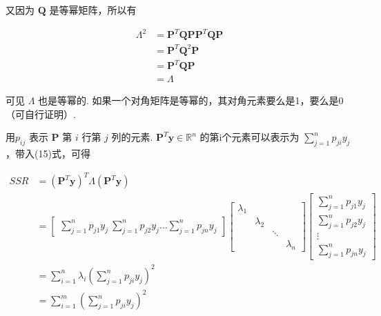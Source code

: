 \documentclass[UTF8]{ctexart}
\begin{document}
    又因为 $ \boldsymbol{Q} $ 是等幂矩阵，所以有
    
    \begin{equation}
    	\begin{aligned}
    	    \boldsymbol{\varLambda}^2 & = \boldsymbol{P}^T \boldsymbol{Q} \boldsymbol{P} \boldsymbol{P}^T \boldsymbol{Q} \boldsymbol{P} \\
    	    & = \boldsymbol{P}^T \boldsymbol{Q}^2 \boldsymbol{P} \\
    	    & = \boldsymbol{P}^T \boldsymbol{Q} \boldsymbol{P} \\
    	    & = \boldsymbol{\varLambda}
    	\end{aligned}
    \end{equation}

    可见 $ \boldsymbol{\varLambda} $ 也是等幂的. 如果一个对角矩阵是等幂的，其对角元素要么是1，要么是0（可自行证明）.
    
    用$ p_{ij} $ 表示 $ \boldsymbol{P} $ 第 $ i $ 行第 $ j $ 列的元素. $ \boldsymbol{P}^T \boldsymbol{y} \in \mathbb{R}^n $ 的第i个元素可以表示为 $ \sum_{j=1}^{n}{p_{ji} y_{j}} $ ，带入(15)式，可得
    
    \begin{equation}
    	\begin{aligned}
    		SSR & = (\boldsymbol{P}^T \boldsymbol{y})^T \boldsymbol{\varLambda} (\boldsymbol{P}^T \boldsymbol{y}) \\
    		& = \begin{bmatrix}
    		    \sum_{j=1}^{n}{p_{j1} y_{j}} \ \sum_{j=1}^{n}{p_{j2} y_{j}} \dots \sum_{j=1}^{n}{p_{jn} y_{j}}
    		\end{bmatrix} \begin{bmatrix}
    		    \lambda_1 & & & \\
    		    & \lambda_2 & & \\
    		    & & \ddots & \\
    		    & & & \lambda_n
    	    \end{bmatrix} \begin{bmatrix}
    	        \sum_{j=1}^{n}{p_{j1} y_{j}} \\
    	        \sum_{j=1}^{n}{p_{j2} y_{j}} \\
    	        \vdots \\
    	        \sum_{j=1}^{n}{p_{jn} y_{j}}
            \end{bmatrix} \\
            & = \sum_{i=1}^{n}{\lambda_i (\sum_{j=1}^{n}{p_{ji} y_{j}})^2} \\
            & = \sum_{i=1}^{m}{(\sum_{j=1}^{n}{p_{ji} y_{j}})^2}
        \end{aligned}
    \end{equation}
\end{document}
